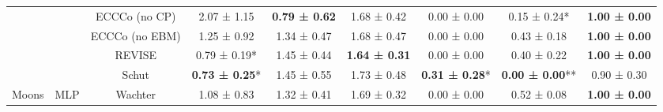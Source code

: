 \begin{table}
{\begin{tabular}[t]{ccccccccc}
 &  & ECCCo (no CP) & 2.07 ± 1.15\hphantom{*}\hphantom{*} & \textbf{0.79 ± 0.62}\hphantom{*}\hphantom{*} & 1.68 ± 0.42\hphantom{*}\hphantom{*} & 0.00 ± 0.00\hphantom{*}\hphantom{*} & 0.15 ± 0.24*\hphantom{*} & \textbf{1.00 ± 0.00}\hphantom{*}\hphantom{*}\\

 &  & ECCCo (no EBM) & 1.25 ± 0.92\hphantom{*}\hphantom{*} & 1.34 ± 0.47\hphantom{*}\hphantom{*} & 1.68 ± 0.47\hphantom{*}\hphantom{*} & 0.00 ± 0.00\hphantom{*}\hphantom{*} & 0.43 ± 0.18\hphantom{*}\hphantom{*} & \textbf{1.00 ± 0.00}\hphantom{*}\hphantom{*}\\

 &  & REVISE & 0.79 ± 0.19*\hphantom{*} & 1.45 ± 0.44\hphantom{*}\hphantom{*} & \textbf{1.64 ± 0.31}\hphantom{*}\hphantom{*} & 0.00 ± 0.00\hphantom{*}\hphantom{*} & 0.40 ± 0.22\hphantom{*}\hphantom{*} & \textbf{1.00 ± 0.00}\hphantom{*}\hphantom{*}\\

 &  & Schut & \textbf{0.73 ± 0.25}*\hphantom{*} & 1.45 ± 0.55\hphantom{*}\hphantom{*} & 1.73 ± 0.48\hphantom{*}\hphantom{*} & \textbf{0.31 ± 0.28}*\hphantom{*} & \textbf{0.00 ± 0.00}** & 0.90 ± 0.30\hphantom{*}\hphantom{*}\\

\multirow[t]{-12}{*}{\centering\arraybackslash Moons} & \multirow[t]{-6}{*}{\centering\arraybackslash MLP} & Wachter & 1.08 ± 0.83\hphantom{*}\hphantom{*} & 1.32 ± 0.41\hphantom{*}\hphantom{*} & 1.69 ± 0.32\hphantom{*}\hphantom{*} & 0.00 ± 0.00\hphantom{*}\hphantom{*} & 0.52 ± 0.08\hphantom{*}\hphantom{*} & \textbf{1.00 ± 0.00}\hphantom{*}\hphantom{*}\\
\bottomrule
\end{tabular}}
\end{table}
